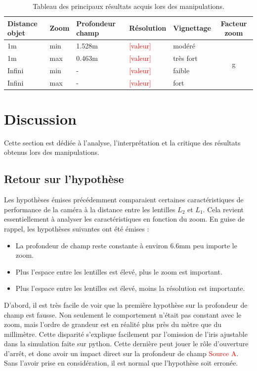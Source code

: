 \documentclass[11pt,letterpaper]{article}
\begin{document}
\begin{table}[h]
\centering
\begin{tabular}{|l|l||l|l|l||c|}
\hline
\textbf{Distance objet} & \textbf{Zoom} & \textbf{Profondeur champ} & \textbf{Résolution} & \textbf{Vignettage} & \textbf{Facteur zoom} \\ \hline
1m & min  & 1.528m & \textcolor{red}{[valeur]} & modéré & \multirow{4}{*}{g} \\ \cline{1-5}
1m & max  & 0.463m & \textcolor{red}{[valeur]} & très fort & \\ \cline{1-5}
Infini & min  & - & \textcolor{red}{[valeur]} & faible & \\ \cline{1-5}
Infini & max  & - & \textcolor{red}{[valeur]} & fort & \\ \hline
\end{tabular}
\caption{Tableau des principaux résultats acquis lors des manipulations.}
\end{table}


\section{Discussion}

Cette section est dédiée à l'analyse, l'interprétation et la critique des résultats
obtenus lors des manipulations.

\subsection{Retour sur l'hypothèse}

Les hypothèses émises précédemment comparaient certaines caractéristiques de performance
de la caméra à la distance entre les lentilles $L_2$ et $L_1$. Cela revient 
essentiellement à analyser les caractéristiques en fonction du zoom. En guise de rappel,
les hypothèses suivantes ont été émises :

\begin{itemize}
\item La profondeur de champ reste constante à environ 6.6mm peu importe le zoom.
\item Plus l'espace entre les lentilles est élevé, plus le zoom est important.
\item Plus l'espace entre les lentilles est élevé, moins la résolution est importante.
\end{itemize}

D'abord, il est très facile de voir que la première hypothèse sur la profondeur
de champ est fausse. Non seulement le comportement n'était pas constant avec le zoom,
mais l'ordre de grandeur est en réalité plus près du mètre que du millimètre. Cette
disparité s'explique facilement par l'omission de l'iris ajustable dans la simulation
faite sur python. Cette dernière peut jouer le rôle d'ouverture d'arrêt, et donc avoir
un impact direct sur la profondeur de champ \textcolor{red}{Source A}. Sans l'avoir 
prise en considération, il est normal que l'hypothèse soit erronée.
\end{document}
